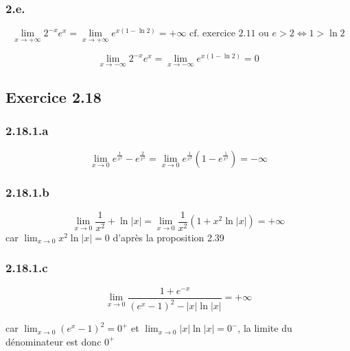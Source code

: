 \documentclass[a4paper,10pt]{report}
\begin{document}
\subsubsection*{2.e.}
\begin{displaymath}
	\lim_{x \rightarrow +\infty} 2^{-x}e^x = \lim_{x \rightarrow +\infty} e^{x(1-\ln 2)} = +\infty \text{ cf. exercice 2.11 ou } e>2 \Longleftrightarrow 1 > \ln 2
\end{displaymath}

\begin{displaymath}
	\lim_{x \rightarrow -\infty} 2^{-x}e^x = \lim_{x \rightarrow -\infty} e^{x(1-\ln 2)} = 0^{}
\end{displaymath}


\subsection*{Exercice 2.18}

\subsubsection*{2.18.1.a}
\begin{displaymath}
	\lim_{x \rightarrow 0} e^{\frac{1}{x^2}} - e^{\frac{2}{x^2}}  = \lim_{x \rightarrow 0} e^{\frac{1}{x^2}}(1 - e^{\frac{1}{x^2}}) = -\infty
\end{displaymath}

\subsubsection*{2.18.1.b}
\begin{displaymath}
	\lim_{x \rightarrow 0} \frac{1}{x^2}  + \ln |x| = \lim_{x \rightarrow 0} \frac{1}{x^2}  (1+ x^2\ln |x|) = +\infty
\end{displaymath}
car $ \lim_{x \rightarrow 0} x^2\ln |x| = 0$ d'après la proposition 2.39

\subsubsection*{2.18.1.c}
\begin{displaymath}
	\lim_{x \rightarrow 0} \frac{1+e^{-x}}{(e^x-1)^2 - |x|\ln |x|} = + \infty
\end{displaymath}

car $ \lim_{x \rightarrow 0} (e^x-1)^2 = 0^{+}$ et $ \lim_{x \rightarrow 0} |x|\ln |x| = 0^{-}$, la limite du dénominateur est donc $0^{+}$
\end{document}
